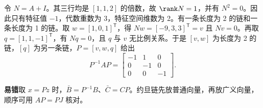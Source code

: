 

\sol 令 $N=A+I$。其三行均是 $[1,1,2]$ 的倍数，故 $\rank N=1$，并有 $N^2=0$。因此只有特征值 $-1$，代数重数为 3，特征空间维数为 2。有一条长度为 2 的链和一条长度为 1 的链。取 $w=[1,0,1]^{\mathsf T}$，得 $Nw=[-9,3,3]^{\mathsf T}=v$ 且 $Nv=0$。再取 $q=[1,1,-1]^{\mathsf T}$，有 $Nq=0$，且 $q$ 与 $v$ 无比例关系。于是 $[v,w]$ 为长度为 2 的链，$[q]$ 为另一条链，$P=[v,w,q]$ 给出
\[
P^{-1}AP=\begin{bmatrix}-1&1&0\\0&-1&0\\0&0&-1\end{bmatrix}.
\]

\noindent\textbf{易错}\quad 取 $x=Pz$ 时，$\bar B=P^{-1}B$、$\bar C=CP$。约旦链先放普通向量，再放广义向量，顺序可用 $AP=PJ$ 核对。



